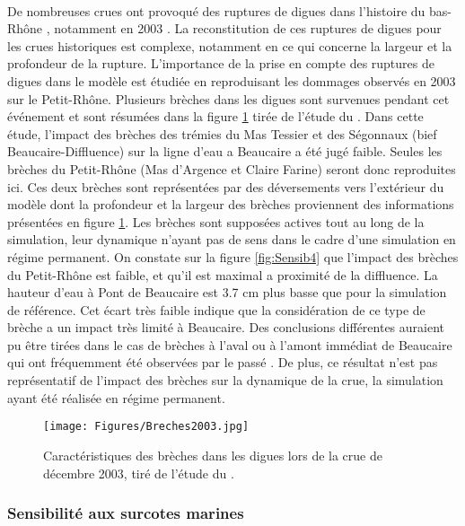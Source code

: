\documentclass[11pt]{article}
\begin{document}
	\paragraph{} De nombreuses crues ont provoqué des ruptures de digues dans l'histoire du bas-Rhône \citep{pichard_sept_2014}, notamment en 2003 \citep{medd_debit_2005}. La reconstitution de ces ruptures de digues pour les crues historiques est complexe, notamment en ce qui concerne la largeur et la profondeur de la rupture. L'importance de la prise en compte des ruptures de digues dans le modèle est étudiée en reproduisant les dommages observés en 2003 sur le Petit-Rhône. Plusieurs brèches dans les digues sont survenues pendant cet événement et sont résumées dans la figure \ref{fig:Breches2003} tirée de l'étude du \citet{symadrem_programme_2012}. Dans cette étude, l'impact des brèches des trémies du Mas Tessier et des Ségonnaux (bief Beaucaire-Diffluence) sur la ligne d'eau a Beaucaire a été jugé faible. Seules les brèches du Petit-Rhône (Mas d'Argence et Claire Farine) seront donc reproduites ici. Ces deux brèches sont représentées par des déversements vers l'extérieur du modèle dont la profondeur et la largeur des brèches proviennent des informations présentées en figure \ref{fig:Breches2003}. Les brèches sont supposées actives tout au long de la simulation, leur dynamique n'ayant pas de sens dans le cadre d'une simulation en régime permanent. On constate sur la figure \ref{fig:Sensib4} que l'impact des brèches du Petit-Rhône est faible, et qu'il est maximal a proximité de la diffluence. La hauteur d'eau à Pont de Beaucaire est 3.7 cm plus basse que pour la simulation de référence. Cet écart très faible indique que la considération de ce type de brèche a un impact très limité à Beaucaire. Des conclusions différentes auraient pu être tirées dans le cas de brèches à l'aval ou à l'amont immédiat de Beaucaire qui ont fréquemment été observées par le passé \citep{pichard_sept_2014}. De plus, ce résultat n'est pas représentatif de l'impact des brèches sur la dynamique de la crue, la simulation ayant été réalisée en régime permanent.
	
	\begin{figure}[h]
		\centering
		\texttt{[image: Figures/Breches2003.jpg]}
        \caption{Caractéristiques des brèches dans les digues lors de la crue de décembre 2003, tiré de l'étude du \citet{symadrem_programme_2012}.}
		\label{fig:Breches2003}
	\end{figure}		
	
	\subsubsection{Sensibilité aux surcotes marines}	
	
\end{document}
